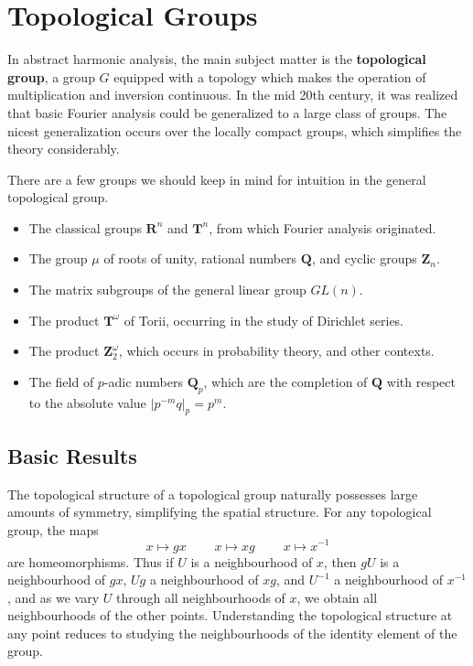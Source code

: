 \chapter{Topological Groups}

In abstract harmonic analysis, the main subject matter is the {\bf topological group}, a group $G$ equipped with a topology which makes the operation of multiplication and inversion continuous. In the mid 20th century, it was realized that basic Fourier analysis could be generalized to a large class of groups. The nicest generalization occurs over the locally compact groups, which simplifies the theory considerably.

\begin{example}
    There are a few groups we should keep in mind for intuition in the general topological group.
    \begin{itemize}
        \item The classical groups $\mathbf{R}^n$ and $\mathbf{T}^n$, from which Fourier analysis originated.
        \item The group $\mu$ of roots of unity, rational numbers $\mathbf{Q}$, and cyclic groups $\mathbf{Z}_n$.
        \item The matrix subgroups of the general linear group $GL(n)$.
        \item The product $\mathbf{T}^\omega$ of Torii, occurring in the study of Dirichlet series.
        \item The product $\mathbf{Z}_2^\omega$, which occurs in probability theory, and other contexts.
        \item The field of $p$-adic numbers $\mathbf{Q}_p$, which are the completion of $\mathbf{Q}$ with respect to the absolute value $|p^{-m} q|_p = p^m$.
    \end{itemize}
\end{example}

\section{Basic Results}

The topological structure of a topological group naturally possesses large amounts of symmetry, simplifying the spatial structure. For any topological group, the maps
%
\[ x \mapsto gx\ \ \ \ \ \ \ \ \ \ x \mapsto xg\ \ \ \ \ \ \ \ \ \ x \mapsto x^{-1} \]
%
are homeomorphisms. Thus if $U$ is a neighbourhood of $x$, then $gU$ is a neighbourhood of $gx$, $Ug$ a neighbourhood of $xg$, and $U^{-1}$ a neighbourhood of $x^{-1}$, and as we vary $U$ through all neighbourhoods of $x$, we obtain all neighbourhoods of the other points. Understanding the topological structure at any point reduces to studying the neighbourhoods of the identity element of the group.

